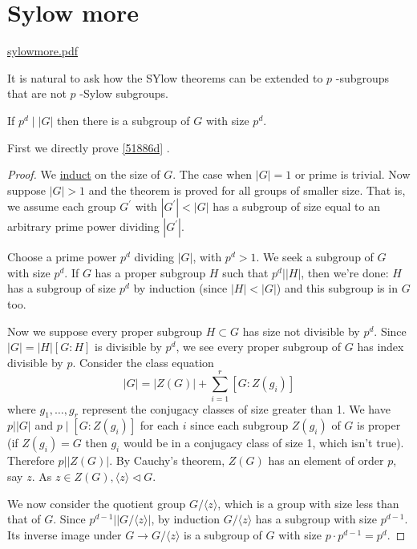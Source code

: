 \section{Sylow more}

\href{https://kconrad.math.uconn.edu/blurbs/grouptheory/sylowmore.pdf}{sylowmore.pdf}

It is natural to ask how the SYlow theorems can be extended to $p$ -subgroups that are not $p$ -Sylow subgroups.

\begin{theorem}[Theorem 4.1]
If $p^d \mid |G|$ then there is a subgroup of $G$ with size $p^d$.\label{51886d}
\end{theorem}

\begin{note}
First we directly prove \cref{51886d} .
\end{note}
\begin{proof}
We \underline{induct} on the size of $G$. The case when $|G|=1$ or prime is trivial. Now suppose $|G|>1$ and the theorem is proved for all groups of smaller size. That is, we assume each group $G^{\prime}$ with $\left|G^{\prime}\right|<|G|$ has a subgroup of size equal to an arbitrary prime power dividing $\left|G^{\prime}\right|$.

Choose a prime power $p^d$ dividing $|G|$, with $p^d>1$. We seek a subgroup of $G$ with size $p^d$. If $G$ has a proper subgroup $H$ such that $p^d| |H|$, then we're done: $H$ has a subgroup of size $p^d$ by induction (since $|H|<|G|$) and this subgroup is in $G$ too.

Now we suppose every proper subgroup $H \subset G$ has size not divisible by $p^d$. Since $|G|=|H|[G: H]$ is divisible by $p^d$, we see every proper subgroup of $G$ has index divisible by $p$. Consider the class equation
\[
|G|=|Z(G)|+\sum_{i=1}^r\left[G: Z\left(g_i\right)\right]
\]
where $g_1, \ldots, g_r$ represent the conjugacy classes of size greater than 1. We have $p||G|$ and $p \mid\left[G: Z\left(g_i\right)\right]$ for each $i$ since each subgroup $Z\left(g_i\right)$ of $G$ is proper (if $Z\left(g_i\right)=G$ then $g_i$ would be in a conjugacy class of size 1, which isn't true). Therefore $p||Z(G)|$. By Cauchy's theorem, $Z(G)$ has an element of order $p$, say $z$. As $z \in Z(G),\langle z\rangle \triangleleft G$.

We now consider the quotient group $G /\langle z\rangle$, which is a group with size less than that of $G$. Since $p^{d-1}| |G /\langle z\rangle|$, by induction $G /\langle z\rangle$ has a subgroup with size $p^{d-1}$. Its inverse image under $G \rightarrow G /\langle z\rangle$ is a subgroup of $G$ with size $p \cdot p^{d-1}=p^d$.
\end{proof}

